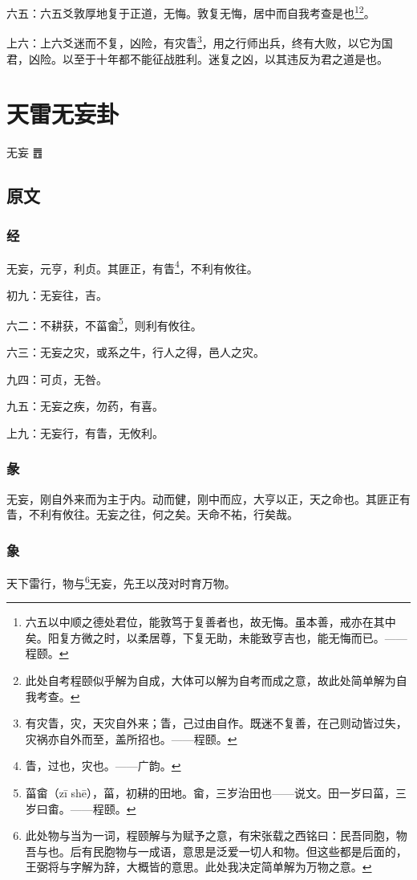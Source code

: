 \documentclass[12pt,oneside]{book}
\begin{document}
六五：六五爻敦厚地复于正道，无悔。敦复无悔，居中而自我考查是也\footnote{六五以中顺之德处君位，能敦笃于复善者也，故无悔。虽本善，戒亦在其中矣。阳复方微之时，以柔居尊，下复无助，未能致亨吉也，能无悔而已。——程颐。}\footnote{此处自考程颐似乎解为自成，大体可以解为自考而成之意，故此处简单解为自我考查。}。

上六：上六爻迷而不复，凶险，有灾眚\footnote{有灾眚，灾，天灾自外来；眚，己过由自作。既迷不复善，在己则动皆过失，灾祸亦自外而至，盖所招也。——程颐。}，用之行师出兵，终有大败，以它为国君，凶险。以至于十年都不能征战胜利。迷复之凶，以其违反为君之道是也。


\chapter{天雷无妄卦}
无妄 {\Large ䷘}

\section{原文}
\subsection{经}
无妄，元亨，利贞。其匪正，有眚\footnote{眚，过也，灾也。——广韵。}，不利有攸往。

初九：无妄往，吉。

六二：不耕获，不菑畲\footnote{菑畲（zī shē），菑，初耕的田地。畲，三岁治田也——说文。田一岁曰菑，三岁曰畬。——程颐。}，则利有攸往。

六三：无妄之灾，或系之牛，行人之得，邑人之灾。

九四：可贞，无咎。

九五：无妄之疾，勿药，有喜。

上九：无妄行，有眚，无攸利。

\subsection{彖}
无妄，刚自外来而为主于内。动而健，刚中而应，大亨以正，天之命也。其匪正有眚，不利有攸往。无妄之往，何之矣。天命不祐，行矣哉。

\subsection{象}
天下雷行，物与\footnote{此处物与当为一词，程颐解与为赋予之意，有宋张载之西铭曰：民吾同胞，物吾与也。后有民胞物与一成语，意思是泛爱一切人和物。但这些都是后面的，王弼将与字解为辞，大概皆的意思。此处我决定简单解为万物之意。}无妄，先王以茂对时育万物。
\end{document}
